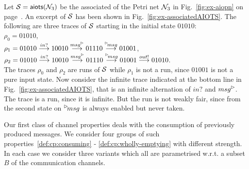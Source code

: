 \begin{example}\label{ex:maxtraces}
 Let $\S = \aiots(\pnN_3)$ be the associated \AIOTS of the Petri net $\pnN_3$ in Fig.~\ref{fig:ex-aiopn} on page~\pageref{fig:ex-aiopn}. 
An excerpt of $\S$ has been shown in Fig.~\ref{fig:ex-associatedAIOTS}.
The following are three traces of $\S$ starting in the initial state $01010$: \\[2mm]
{$\rho_0 = 01010$,\\
        $\rho_1 = 01010 \goes{{in?}} 10010 \goes{\outact{msg}} 01110 \goes{\inact{msg}} 01001$, \\
        $\rho_2 = 01010 \goes{{in?}} 10010 \goes{\outact{msg}} 01110 \goes{\inact{msg}} 01001 \goes{out!} 01010$.}\\[2mm]
    The traces $\rho_0$ and $\rho_2$ are runs of $\S$ while $\rho_1$ is not a run, since
    $01001$ is not a pure input state.
    Now consider the infinite trace indicated at the bottom line in Fig.~\ref{fig:ex-associatedAIOTS}, 
that is an infinite alternation of $in?$ and $\outact{msg}$. The trace is a run, since it is infinite. But the run is not weakly fair, since from the second state on $\inact{msg}$ is always enabled but never taken.
\end{example}

Our first class of channel properties deals with the consumption of previously produced messages.
We consider four groups of such properties~\ref{def:cp:consuming} - \ref{def:cp:wholly-emptying} with different strength.  In each case we consider three variants which all are parametrised w.r.t. a subset $B$ of the communication channels.

